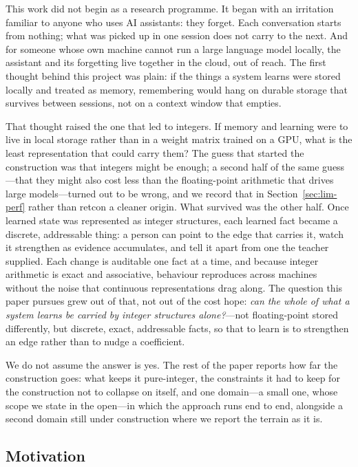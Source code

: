 \documentclass[11pt,a4paper]{article}
\begin{document}
This work did not begin as a research programme. It began with an
irritation familiar to anyone who uses AI assistants: they forget. Each
conversation starts from nothing; what was picked up in one session does
not carry to the next. And for someone whose own machine cannot run a
large language model locally, the assistant and its forgetting live
together in the cloud, out of reach. The first thought behind this
project was plain: if the things a system learns were stored locally and
treated as memory, remembering would hang on durable storage that
survives between sessions, not on a context window that empties.

That thought raised the one that led to integers. If memory and learning
were to live in local storage rather than in a weight matrix trained on a
GPU, what is the least representation that could carry them? The guess
that started the construction was that integers might be enough; a
second half of the same guess---that they might also cost less than the
floating-point arithmetic that drives large models---turned out to be
wrong, and we record that in Section~\ref{sec:lim-perf} rather than
retcon a cleaner origin. What survived was the other half. Once learned
state was represented as integer structures, each learned fact became a
discrete, addressable thing: a person can point to the edge that carries
it, watch it strengthen as evidence accumulates, and tell it apart from
one the teacher supplied. Each change is auditable one fact at a time,
and because integer arithmetic is exact and associative, behaviour
reproduces across machines without the noise that continuous
representations drag along. The question this paper pursues grew out of
that, not out of the cost hope: \emph{can the whole of what a system
learns be carried by integer structures alone?}---not floating-point
stored differently, but discrete, exact, addressable facts, so that to
learn is to strengthen an edge rather than to nudge a coefficient.

We do not assume the answer is yes. The rest of the paper reports how
far the construction goes: what keeps it pure-integer, the constraints
it had to keep for the construction not to collapse on itself, and one
domain---a small one, whose scope we state in the open---in which the
approach runs end to end, alongside a second domain still under
construction where we report the terrain as it is.

\subsection{Motivation}
\label{sec:intro-motivation}
\end{document}
